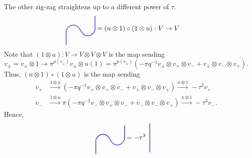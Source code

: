 \documentclass{amsart}
\newcommand{\hackcenter}[1]{
 \xy (0,0)*{#1}; \endxy}
\theoremstyle{plain}
\theoremstyle{definition}
\theoremstyle{definition}
\numberwithin{equation}{section}
\numberwithin{theorem}{section}
\renewcommand{\to}{\rightarrow}
\numberwithin{equation}{section}
\begin{document}
The other zig-zag straightens up to a different power of $\tau$.
\begin{align*}
   \hackcenter{ \begin{tikzpicture} [ scale=.75]
%
\draw[thick,   blue] (0,0).. controls ++(.25,.5) and ++(-.25,.5).. (1,0);
\draw[thick,   blue] (1,0).. controls ++(.25,-.5) and ++(-.25,-.5).. (2,0);
%
\draw[thick, blue] (2,0) to (2,1);
%
\draw[thick, blue] (0,0) to (0,-1);
\end{tikzpicture}} & =(n\otimes 1)\circ (1\otimes u):V \to V
\end{align*}
Note that $(1\otimes u):V \to V\otimes V\otimes V$ is the map sending
\[v_{\pm} =v_{\pm}\otimes 1 \to \pi^{p(v_{\pm})}v_{\pm}\otimes u(1)=\pi^{p(v_{\pm})}(-\pi q^{-1}  v_{\pm}\otimes  v_+\otimes v_- + v_{\pm}\otimes  v_-\otimes v_+).\]
Thus, $(n\otimes 1)\circ (1\otimes u)$ is the map sending
\begin{align*}
  v_+ &\overset{1\otimes u}{\rightarrow} (-\pi q^{-1}  v_{+}\otimes  v_+\otimes v_- + v_{+}\otimes  v_-\otimes v_+)\overset{n\otimes 1}{\rightarrow} -\tau^3 v_+  \\
  v_- &\overset{1\otimes u}{\rightarrow}  \pi(-\pi q^{-1}  v_{-}\otimes  v_+\otimes v_- + v_{-}\otimes  v_-\otimes v_+)\overset{n\otimes 1}{\rightarrow} -\tau^3 v_-.
\end{align*}
Hence,
\begin{align*}
    \hackcenter{ \begin{tikzpicture} [xscale=1, scale=.75]
%
\draw[thick,   blue] (0,0).. controls ++(.25,.5) and ++(-.25,.5).. (1,0);
\draw[thick,   blue] (1,0).. controls ++(.25,-.5) and ++(-.25,-.5).. (2,0);
%
\draw[thick, blue] (2,0) to (2,1);
%
\draw[thick, blue] (0,0) to (0,-1);
\end{tikzpicture}}&=-\tau^3 \;\;
\hackcenter{ \begin{tikzpicture} [xscale=1, scale=.75]
\draw[thick, blue] (1,1) to (1,-1);
\end{tikzpicture}}
\end{align*}
\end{document}
